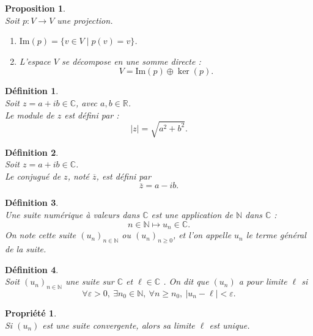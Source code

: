\documentclass[a4paper, 14pt]{report}
\newtheorem{definition}{Définition}[section]
\newtheorem{proposition}{Proposition}[section]
\newtheorem{propriety}{Propriété}[section]
\begin{document}
\begin{onehalfspace}
{\begin{proposition} \cite{lang2012algebra}\\
Soit \( p : V \to V \) une projection.
	\begin{enumerate}[label=\roman*)]
		\item \( \mathrm{Im}(p) = \{v \in V \mid p(v) = v\} \).
		\item L'espace \( V \) se décompose en une somme directe :
		\[
		V = \mathrm{Im}(p) \oplus \ker(p).
		\]
	\end{enumerate}
\end{proposition}


\begin{definition} \cite{rudin1976principles} \\
Soit \( z = a + ib \in \mathbb{C} \), avec \( a, b \in \mathbb{R} \). \\
Le module de \( z \) est défini par :
\[
|z| = \sqrt{a^2 + b^2}.
\]
\end{definition}

\begin{definition} \cite{rudin1976principles} \\
Soit \( z = a + ib \in \mathbb{C} \).\\
Le conjugué de \( z \), noté \( \overline{z} \), est défini par
	\[
	\overline{z} = a - ib.
	\]
\end{definition}

\begin{definition}\cite{chatterji1997cours} \\
Une suite numérique à valeurs dans $\mathbb{C}$ est une application de $\mathbb{N}$ dans $\mathbb{C}$ :
	\[
	n \in \mathbb{N} \longmapsto u_n \in \mathbb{C}.
	\]
On note cette suite $(u_n)_{n \in \mathbb{N}}$ ou $(u_n)_{n \geq 0}$, et l'on appelle $u_n$ le terme général de la suite.
\end{definition}


\begin{definition} \cite{chatterji1997cours}\\
Soit $(u_n)_{n \in \mathbb{N}}$ une suite sur $\mathbb{C}$ et $\ell \in \mathbb{C}$ . On dit que $(u_n)$ a pour limite $\ell$ si
\[
\forall \varepsilon > 0 ,\ \exists n_0 \in \mathbb{N} ,\ \forall n \geq n_0,\ |u_n - \ell| < \varepsilon.
\]
\end{definition}

\begin{propriety} \cite{chatterji1997cours}\\
Si $(u_n)$ est une suite convergente, alors sa limite $\ell$ est unique.
\end{propriety}


}
\end{onehalfspace}
\end{document}
